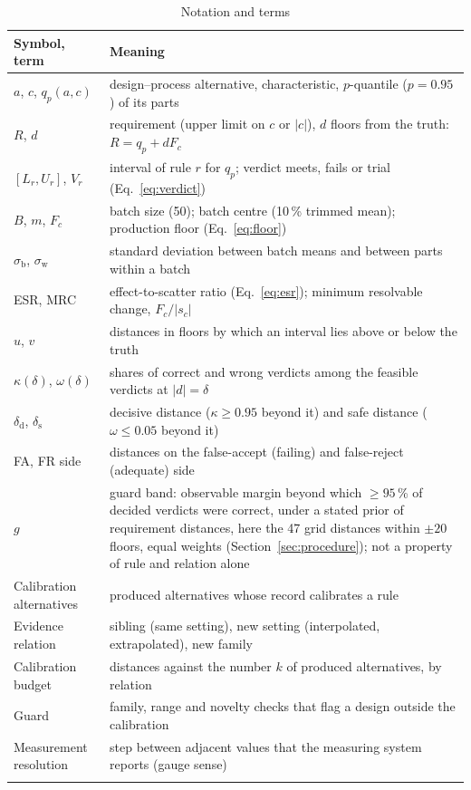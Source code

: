 \documentclass[pdflatex,sn-basic,lineno]{sn-jnl}
\newcommand{\tabsizesmall}{\footnotesize}%
\begin{document}
\begin{appendices}
\begin{table}[p]%
\tabsizesmall
\setlength{\tabcolsep}{4pt}
\caption{Notation and terms}\label{tab:notation}
\begin{tabular}{@{}L{3.0cm}L{9.75cm}@{}}
\toprule
Symbol, term & Meaning \\
\midrule
$a$, $c$, $q_p(a,c)$ & design--process alternative, characteristic, $p$-quantile ($p=0.95$) of its parts \\
$R$, $d$ & requirement (upper limit on $c$ or $|c|$), $d$ floors from the truth: $R=q_p+dF_c$ \\
$[L_r,U_r]$, $V_r$ & interval of rule $r$ for $q_p$; verdict meets, fails or trial (Eq.~\ref{eq:verdict}) \\
$B$, $m$, $F_c$ & batch size (50); batch centre (10\,\% trimmed mean); production floor (Eq.~\ref{eq:floor}) \\
$\sigma_\mathrm{b}$, $\sigma_\mathrm{w}$ & standard deviation between batch means and between parts within a batch \\
ESR, MRC & effect-to-scatter ratio (Eq.~\ref{eq:esr}); minimum resolvable change, $F_c/|s_c|$ \\
$u$, $v$ & distances in floors by which an interval lies above or below the truth \\
$\kappa(\delta)$, $\omega(\delta)$ & shares of correct and wrong verdicts among the feasible verdicts at $|d|=\delta$ \\
$\delta_\mathrm{d}$, $\delta_\mathrm{s}$ & decisive distance ($\kappa\ge0.95$ beyond it) and safe distance ($\omega\le0.05$ beyond it) \\
FA, FR side & distances on the false-accept (failing) and false-reject (adequate) side \\
$g$ & guard band: observable margin beyond which ${\ge}95$\,\% of decided verdicts were correct, under a stated prior of requirement distances, here the 47 grid distances within $\pm20$ floors, equal weights (Section~\ref{sec:procedure}); not a property of rule and relation alone \\
Calibration alternatives & produced alternatives whose record calibrates a rule \\
Evidence relation & sibling (same setting), new setting (interpolated, extrapolated), new family \\
Calibration budget & distances against the number $k$ of produced alternatives, by relation \\
Guard & family, range and novelty checks that flag a design outside the calibration \\
Measurement resolution & step between adjacent values that the measuring system reports (gauge sense) \\
\botrule
\end{tabular}
\end{table}


\end{appendices}
\end{document}
